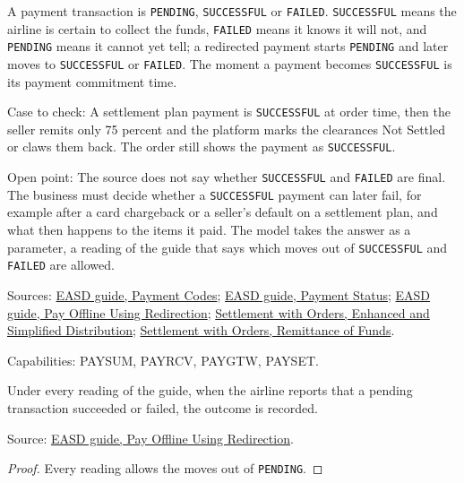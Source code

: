 \begin{definition}
  \label{def:payment-payment-status}
  A payment transaction is \texttt{PENDING}, \texttt{SUCCESSFUL} or
  \texttt{FAILED}. \texttt{SUCCESSFUL} means the airline is certain to
  collect the funds, \texttt{FAILED} means it knows it will not, and
  \texttt{PENDING} means it cannot yet tell; a redirected payment starts
  \texttt{PENDING} and later moves to \texttt{SUCCESSFUL} or
  \texttt{FAILED}. The moment a payment becomes \texttt{SUCCESSFUL} is its
  payment commitment time.

  Case to check: A settlement plan payment is \texttt{SUCCESSFUL} at order
  time, then the seller remits only 75 percent and the platform marks the
  clearances Not Settled or claws them back. The order still shows the
  payment as \texttt{SUCCESSFUL}.

  Open point: The source does not say whether \texttt{SUCCESSFUL} and
  \texttt{FAILED} are final. The business must decide whether a
  \texttt{SUCCESSFUL} payment can later fail, for example after a card
  chargeback or a seller's default on a settlement plan, and what then
  happens to the items it paid.  The model takes the answer as a parameter, a
  reading of the guide that says which moves out of \texttt{SUCCESSFUL} and
  \texttt{FAILED} are allowed.

  Sources: \href{https://standards.atlassian.net/wiki/spaces/EASD/pages/574849161/Payment+Codes}{EASD guide, Payment Codes};
  \href{https://standards.atlassian.net/wiki/spaces/EASD/pages/574423154/Payment+Status}{EASD guide, Payment Status};
  \href{https://standards.atlassian.net/wiki/spaces/EASD/pages/574455927/Pay+Offline+Using+Redirection}{EASD guide, Pay Offline Using Redirection};
  \href{https://standards.atlassian.net/wiki/spaces/SWO/pages/574653091/Enhanced+and+Simplified+Distribution}{Settlement with Orders, Enhanced and Simplified Distribution};
  \href{https://standards.atlassian.net/wiki/spaces/SWO/pages/574718145/Remittance+of+Funds}{Settlement with Orders, Remittance of Funds}.

  Capabilities: PAYSUM, PAYRCV, PAYGTW, PAYSET.
\end{definition}

\begin{theorem}
  \label{thm:payment-record-pending}
  Under every reading of the guide, when the airline reports that a pending
  transaction succeeded or failed, the outcome is recorded.

  Source: \href{https://standards.atlassian.net/wiki/spaces/EASD/pages/574455927/Pay+Offline+Using+Redirection}{EASD guide, Pay Offline Using Redirection}.
\end{theorem}
\begin{proof}
  Every reading allows the moves out of \texttt{PENDING}.
\end{proof}


